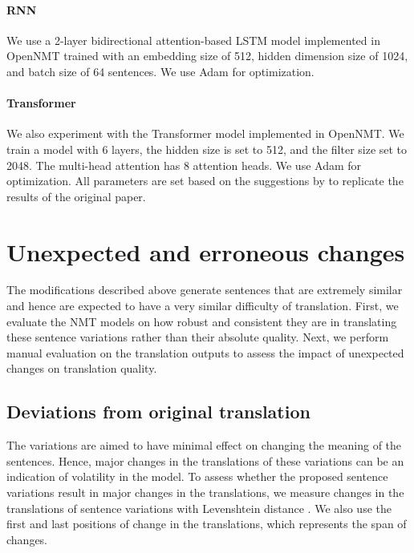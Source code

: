 \paragraph{RNN} We use a 2-layer bidirectional attention-based LSTM model implemented in OpenNMT \citep{2017opennmt} trained with an embedding size of 512, hidden dimension size of 1024, and batch size of 64 sentences. We use Adam \citep{kingma2014adam} for optimization.

\paragraph{Transformer} We also experiment with the Transformer model \citep{vaswani2017attention} implemented in OpenNMT. We train a model with 6 layers, the hidden size is set to 512, and the filter size set to 2048. The multi-head attention has 8 attention heads. We use Adam \citep{kingma2014adam} for optimization. All parameters are set based on the suggestions by \citet{2017opennmt} to replicate the results of the original paper.


\section{Unexpected and erroneous changes} \label{secvolassess}

The modifications described above generate sentences that are extremely similar %
and hence are expected to have a very similar difficulty of translation. 
First, we evaluate the NMT models on how robust and consistent they are in translating these sentence variations rather than their absolute quality.
Next, we perform manual evaluation on the translation outputs to assess the impact of unexpected changes on translation quality.  


\subsection{Deviations from original translation}\label{ctsec}

The variations are aimed to have minimal effect on changing the meaning of the sentences. 
Hence, major changes in the translations of these variations can be an indication of volatility in the model.
To assess whether the proposed sentence variations result in major changes in the translations, we measure changes in the translations of sentence variations with Levenshtein distance \citep{levenshtein1966binary}. %
We also use the first and last positions of change in the translations, which represents the span of changes.

